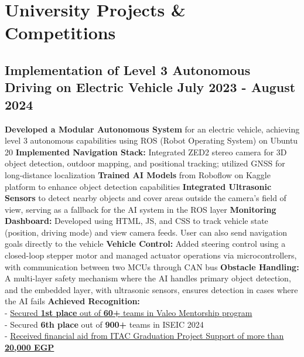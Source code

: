 \section*{University Projects \& Competitions}
%
%
%
\subsection*{
  Implementation of Level 3 Autonomous Driving on Electric Vehicle
  \hspace*{\fill}
  \dateformat July 2023 - August 2024
}
\begin{tasks}
  \task \textbf{Developed a Modular Autonomous System} for an electric vehicle, achieving level 3 autonomous capabilities using ROS (Robot Operating System) on Ubuntu 20
  \task \textbf{Implemented Navigation Stack:} Integrated ZED2 stereo camera for 3D object detection, outdoor mapping, and positional tracking; utilized GNSS for long-distance localization
  \task \textbf{Trained AI Models} from Roboflow on Kaggle platform to enhance object detection capabilities
  \task \textbf{Integrated Ultrasonic Sensors} to detect nearby objects and cover areas outside the camera's field of view, serving as a fallback for the AI system in the ROS layer
  \task \textbf{Monitoring Dashboard:} Developed using HTML, JS, and CSS to track vehicle state (position, driving mode) and view camera feeds. User can also send navigation goals directly to the vehicle
  \task \textbf{Vehicle Control:} Added steering control using a closed-loop stepper motor and managed actuator operations via microcontrollers, with communication between two MCUs through CAN bus
  \task \textbf{Obstacle Handling:} A multi-layer safety mechanism where the AI handles primary object detection, and the embedded layer, with ultrasonic sensors, ensures detection in cases where the AI fails
  \task \textbf{Achieved Recognition:}\\
    - \href{https://www.linkedin.com/feed/update/urn:li:activity:7230237292680933376/}{Secured \textbf{1st place} out of \textbf{60+} teams in Valeo Mentorship program}\\
    - Secured \textbf{6th place} out of \textbf{900+} teams in ISEIC 2024\\
    - \href{https://itida.gov.eg/English/Programs/Graduation/Documents/List-of-Accepted-Graduation-Projects-Round-19-new.pdf}{Received financial aid from ITAC Graduation Project Support of more than \textbf{20,000 EGP}}
\end{tasks}
%
%
%
